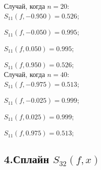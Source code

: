 \documentclass[11pt, russian]{article}
\begin{document}
    
    Случай, когда $n=20$:\\

    
    

    
    $S_{11}(f,-0.950)=0.526$;

    
    $S_{11}(f,-0.050)=0.995$;

    
    $S_{11}(f,0.050)=0.995$;

    
    $S_{11}(f,0.950)=0.526$;\\

    
    

    
    Случай, когда $n=40$:\\

    
    

    
    $S_{11}(f,-0.975)=0.513$;

    
    $S_{11}(f,-0.025)=0.999$;

    
    $S_{11}(f,0.025)=0.999$;

    
    $S_{11}(f,0.975)=0.513$;\\

    
    

    
    \hypertarget{ux441ux43fux43bux430ux439ux43d-s_32fx}{%
\subsection*{\texorpdfstring{4.Сплайн
\(S_{32}(f,x)\)}{4.Сплайн S\_\{32\}(f,x)}}\label{ux441ux43fux43bux430ux439ux43d-s_32fx}}
\end{document}
